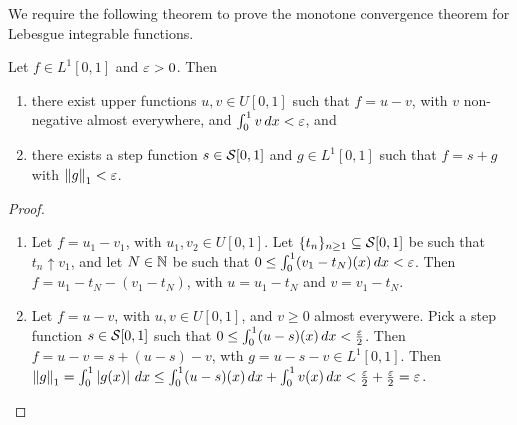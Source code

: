 We require the following theorem to prove the monotone convergence theorem for Lebesgue integrable functions.

\begin{theorem}
    Let $f \in L^{1}[0,1]$ and $\varepsilon > 0$. Then
    \begin{enumerate}
        \item there exist upper functions $u,v \in U[0,1]$ such that $f = u-v$, with $v$ non-negative almost everywhere, and $\int_{0}^{1} v \, dx < \varepsilon$, and
        \item there exists a step function $s \in \mathcal{S}[0,1]$ and $g \in L^{1}[0,1]$ such that $f = s+g$ with $\left\lVert g\right\rVert_{1} < \varepsilon$.
    \end{enumerate}
\end{theorem}
\begin{proof}
    \begin{enumerate}
        \item Let $f = u_{1}-v_{1}$, with $u_{1},v_{2} \in U[0,1]$. Let $\{t_{n}\}_{n \geq 1} \subseteq \mathcal{S}[0,1]$ be such that $t_{n} \uparrow v_{1}$, and let $N \in \mathbb{N}$ be such that $0 \leq \int_{0}^{1} (v_{1}-t_{N})(x) \, dx < \varepsilon$. Then $f = u_{1}-t_{N}-(v_{1}-t_{N})$, with $u = u_{1}-t_{N}$ and $v = v_{1}-t_{N}$.
        \item Let $f = u-v$, with $u,v \in U[0,1]$, and $v \geq 0$ almost everywere. Pick a step function $s \in \mathcal{S}[0,1]$ such that $0 \leq \int_{0}^{1} (u-s)(x) \, dx < \frac{\varepsilon}{2}$. Then $f = u-v = s+(u-s)-v$, wth $g=u-s-v \in L^{1}[0,1]$. Then $\left\lVert g\right\rVert_{1} = \int_{0}^{1} \left| g(x) \right| \, dx \leq \int_{0}^{1} (u-s)(x) \, dx + \int_{0}^{1} v(x) \, dx < \frac{\varepsilon}{2} + \frac{\varepsilon}{2} = \varepsilon$. 
    \end{enumerate}
\end{proof}


